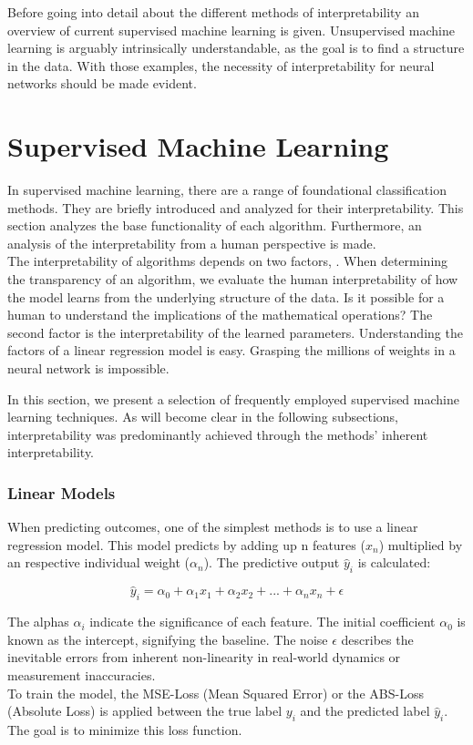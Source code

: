 Before going into detail about the different methods of interpretability an overview of current supervised machine learning is given. Unsupervised machine learning is arguably intrinsically understandable, as the goal is to find a structure in the data. \cite{allen2023interpretable} With those examples, the necessity of interpretability for neural networks should be made evident.

\chapter{Supervised Machine Learning}

In supervised machine learning, there are a range of foundational classification methods. They are briefly introduced and analyzed for their interpretability. This section analyzes the base functionality of each algorithm. Furthermore, an analysis of the interpretability from a human perspective is made.
\\
The interpretability of algorithms depends on two factors, \cite{molnar2022}. When determining the transparency of an algorithm, we evaluate the human interpretability of how the model learns from the underlying structure of the data. Is it possible for a human to understand the implications of the mathematical operations? The second factor is the interpretability of the learned parameters. Understanding the factors of a linear regression model is easy. Grasping the millions of weights in a neural network is impossible.

In this section, we present a selection of frequently employed supervised machine learning techniques. As will become clear in the following subsections, interpretability was predominantly achieved through the methods' inherent interpretability.

\subsection{Linear Models}

When predicting outcomes, one of the simplest methods is to use a linear regression model. This model predicts by adding up n features ($x_n$) multiplied by an respective individual weight ($\alpha_n$). The predictive output $\hat{y}_i$ is calculated:

$$ \hat{y}_i= \alpha_0 + \alpha_1 x_1 + \alpha_2 x_2 +... +\alpha_n x_{n} + \epsilon$$

The alphas $\alpha_i$ indicate the significance of each feature. The initial coefficient $\alpha_0$ is known as the intercept, signifying the baseline. The noise $\epsilon$ describes the inevitable errors from inherent non-linearity in real-world dynamics or measurement inaccuracies.
\\
To train the model, the MSE-Loss (Mean Squared Error) or the ABS-Loss (Absolute Loss) is applied between the true label $y_i$ and the predicted label $\hat{y}_i$. The goal is to minimize this loss function. 

